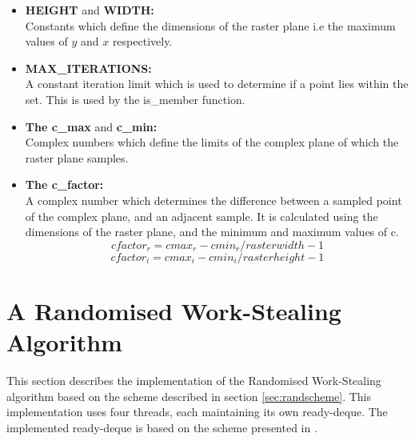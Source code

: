 \begin{itemize}
\item \textbf{HEIGHT} and \textbf{WIDTH:} \\
            Constants which define the dimensions of the raster plane i.e the maximum values of
            \(y\) and \(x\) respectively.
            
            
\item \textbf{MAX\_ITERATIONS:} \\
            A constant iteration limit which is used to determine if a point lies within the set.
            This is used by the is\_member function.
            
\item \textbf{The c\_max} and \textbf{c\_min:} \\
            Complex numbers which define the limits of the complex plane of
            which the raster plane samples.

\item \textbf{The c\_factor:} \\
            A complex number which determines the difference between a sampled point 
            of the complex plane, and an adjacent sample.
            It is calculated using the dimensions of the raster plane, and the 
            minimum and maximum values of c.
            \[ cfactor_r = cmax_r - cmin_r / rasterwidth - 1 \]
            \[ cfactor_i = cmax_i - cmin_i / rasterheight - 1 \]            
\end{itemize} 

\section{A Randomised Work-Stealing Algorithm}
\label{sec:randws}


This section describes the implementation of the Randomised Work-Stealing algorithm based on the scheme described in section \ref{sec:randscheme}.
This implementation uses four threads, each maintaining its own \gls{ready-deque}. The implemented \gls{ready-deque} is based on
the scheme presented in \cite{circdeque}.

